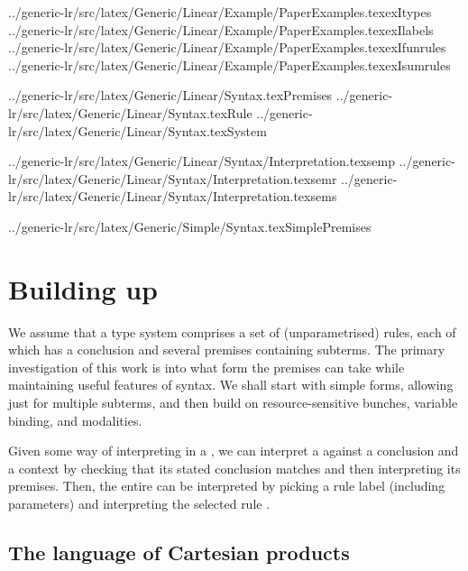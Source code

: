 \def\prefix{../generic-lr/src/latex}

\CatchFileBetweenTags{\exItypes}%
{\prefix/Generic/Linear/Example/PaperExamples.tex}{exItypes}
\CatchFileBetweenTags{\exIlabels}%
{\prefix/Generic/Linear/Example/PaperExamples.tex}{exIlabels}
\CatchFileBetweenTags{\exIfunrules}%
{\prefix/Generic/Linear/Example/PaperExamples.tex}{exIfunrules}
\CatchFileBetweenTags{\exIsumrules}%
{\prefix/Generic/Linear/Example/PaperExamples.tex}{exIsumrules}

\CatchFileBetweenTags{\Premises}%
{\prefix/Generic/Linear/Syntax.tex}{Premises}
\CatchFileBetweenTags{\Rule}%
{\prefix/Generic/Linear/Syntax.tex}{Rule}
\CatchFileBetweenTags{\System}%
{\prefix/Generic/Linear/Syntax.tex}{System}

\CatchFileBetweenTags{\semp}%
{\prefix/Generic/Linear/Syntax/Interpretation.tex}{semp}
\CatchFileBetweenTags{\semr}%
{\prefix/Generic/Linear/Syntax/Interpretation.tex}{semr}
\CatchFileBetweenTags{\sems}%
{\prefix/Generic/Linear/Syntax/Interpretation.tex}{sems}

\CatchFileBetweenTags{\SimplePremises}%
{\prefix/Generic/Simple/Syntax.tex}{SimplePremises}

\section{Building up}

We assume that a type system comprises a set of (unparametrised) rules, each
of which has a conclusion and several premises containing subterms.
The primary investigation of this work is into what form the premises can take
while maintaining useful features of syntax.
We shall start with simple forms, allowing just for multiple subterms, and
then build on resource-sensitive bunches, variable binding, and modalities.

\System{}
\Rule{}

Given some way  of interpreting
 in a , we can interpret a
 against a conclusion and a context by checking that its
stated conclusion matches and then interpreting its premises.
Then, the entire  can be interpreted by picking a rule
label (including parameters)  and interpreting the selected rule
\AgdaSpace{}.

\semr{}
\sems{}

\subsection{The language of Cartesian products}

